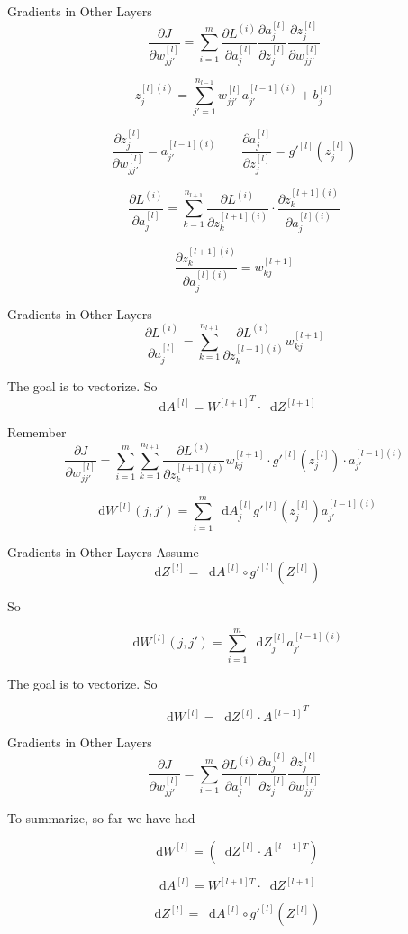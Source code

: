 \documentclass{beamer}
\newcommand{\dd}{\mathop{}\!\text{d}}
\begin{document}
\begin{frame}{Gradients in Other Layers}
\[
\frac{\partial J}{\partial w_{jj'}^{[l]}} = \sum_{i=1}^{m} \frac{\partial L^{(i)}}{\partial a_j^{[l]}}  \frac{\partial a_j^{[l]}}{\partial z_j^{[l]}}  \frac{\partial z_j^{[l]}}{\partial w_{jj'}^{[l]}}
\]

\[
z_j^{[l](i)} = \sum_{j'=1}^{n_{l-1}} w_{jj'}^{[l]} a_{j'}^{[l-1](i)} + b_j^{[l]}
\]

\[
\frac{\partial z_j^{[l]}}{\partial w_{jj'}^{[l]}} = a_{j'}^{[l-1](i)} \quad \quad \frac{\partial a_j^{[l]}}{\partial z_j^{[l]}} = g'^{[l]}(z_j^{[l]})
\]

\[
\frac{\partial L^{(i)}}{\partial a_j^{[l]}} = \sum_{k=1}^{n_{l+1}} \frac{\partial L^{(i)}}{\partial z_k^{[l+1](i)}} \cdot \frac{\partial z_k^{[l+1](i)}}{\partial a_j^{[l](i)}}
\]

\[
\frac{\partial z_k^{[l+1](i)}}{\partial a_j^{[l](i)}} = w_{kj}^{[l+1]}
\]
\end{frame}

\begin{frame}{Gradients in Other Layers}
\[
\frac{\partial L^{(i)}}{\partial a_j^{[l]}} = \sum_{k=1}^{n_{l+1}} \frac{\partial L^{(i)}}{\partial z_k^{[l+1](i)}} w_{kj}^{[l+1]}
\]

The goal is to vectorize. So
\[
\dd A^{[l]}  =  {W^{[l+1]}}^T   \cdot   \dd Z^{[l+1]} 
\]

Remember 
\[
\frac{\partial J}{\partial w_{jj'}^{[l]}} = 
\sum_{i=1}^{m} \sum_{k=1}^{n_{l+1}} \frac{\partial L^{(i)}}{\partial z_k^{[l+1](i)}} w_{kj}^{[l+1]} \cdot 
g'^{[l]}(z_j^{[l]}) \cdot 
a_{j'}^{[l-1](i)}
\]

\[
\dd W^{[l]} (j,j') = 
\sum_{i=1}^{m}     \dd  A_j^{[l]}  g'^{[l]}(z_j^{[l]})    a_{j'}^{[l-1](i)}    
\]
\end{frame}

\begin{frame}{Gradients in Other Layers}
Assume
\[
\dd Z^{[l]}= \dd A^{[l]}  \circ  g'^{[l]}(Z^{[l]}) 
\]

So

\[
\dd  W^{[l]} (j,j') = 
\sum_{i=1}^{m}     \dd Z_{j}^{[l]}    a_{j'}^{[l-1](i)}    
\]

The goal is to vectorize. So

\[
\dd  W^{[l]}  = 
  \dd  Z^{[l]}  \cdot  {A^{[l-1]} }^T
\]
\end{frame}

\begin{frame}{Gradients in Other Layers}
\[
\frac{\partial J}{\partial w_{jj'}^{[l]}} = 
\sum_{i=1}^{m} \frac{\partial L^{(i)}}{\partial a_j^{[l]}}  
\frac{\partial a_j^{[l]}}{\partial z_j^{[l]}}  
\frac{\partial z_j^{[l]}}{\partial w_{jj'}^{[l]}}
\]

To summarize, so far we have had

\[
\dd  W^{[l]} =  (\dd  Z^{[l]} \cdot A^{[l-1]T})
\]


\[
\dd  A^{[l]} = W^{[l+1]T} \cdot \dd  Z^{[l+1]}
\]

\[
\dd  Z^{[l]} = \dd  A^{[l]} \circ g'^{[l]}(Z^{[l]})
\]
\end{frame}
\end{document}
